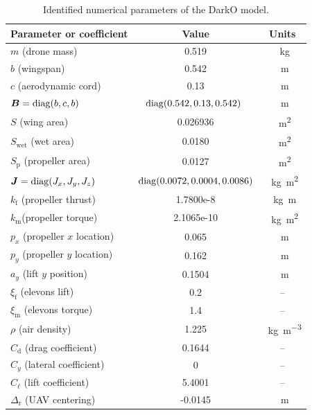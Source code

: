 \begin{table}[ht]
    \centering
      \begin{tabular}{|l|c|c|}
        \hline
        \multicolumn{1}{|c|}{Parameter or coefficient} & Value & Units  \\
        \hline
        $m$ (drone mass)  & 0.519 & \SI{}{\kilogram} \\
        \hline
        $b$ (wingspan)  & 0.542 & \SI{}{\meter} \\
        \hline
        $c$ (aerodynamic cord)  & 0.13 & \SI{}{\meter} \\
        \hline
        $\boldsymbol{B}=\operatorname{diag}(b,c,b)$ & $\!\!\operatorname{diag}(0.542, 0.13, 0.542)$ \!\! & \SI{}{\meter}\\
        \hline
        $S$ (wing area) & 0.026936 & \SI{}{\square\meter}\\
        \hline
        $S_{\text{wet}}$ (wet area) & 0.0180 & \SI{}{\square\meter}\\
        \hline
        $S_{\text{p}}$ (propeller area) & 0.0127 & \SI{}{\square\meter}\\
        \hline
        $\boldsymbol{J}=\operatorname{diag}(J_{x},J_{y},J_{z})$ & \!\! $\operatorname{diag}(0.0072,0.0004,0.0086)$\!\! & \SI{}{\kilogram\square\meter}\\
        \hline
        $k_{\text{f}}$ (propeller thrust) & 1.7800e-8 & \SI{}{\kilogram\meter}\\
        \hline
        $k_{\text{m}}$(propeller torque) & 2.1065e-10 & \SI{}{\kilogram\square\meter}\\
        \hline
        $p_{x}$ (propeller $x$ location) & 0.065 & \SI{}{\meter}\\
        \hline
        $p_{y}$ (propeller $y$ location) & 0.162 & \SI{}{\meter}\\
        \hline
        $a_{y}$ (lift $y$ position) & 0.1504 & \SI{}{\meter}\\
        \hline
        $\xi_{\text{f}}$ (elevons lift) & 0.2 & --\\
        \hline
        $\xi_{\text{m}}$ (elevons torque) & 1.4 & --\\
        \hline
        $\rho$ (air density) & 1.225 & \SI{}{\kilogram\per\cubic\meter}\\
        \hline
        $C_{\text{d}}$ (drag coefficient) & 0.1644 & --\\
        \hline
        $C_{y}$ (lateral coefficient) & 0 & --\\
        \hline
         $C_{\ell}$ (lift coefficient) & 5.4001 & --\\
        \hline
        $\Delta_{\text{r}}$ (UAV centering) & -0.0145 & \SI{}{\meter}\\
        \hline
      \end{tabular}
      \caption{\label{tab:pars} Identified numerical parameters of the DarkO model.}
\end{table}

